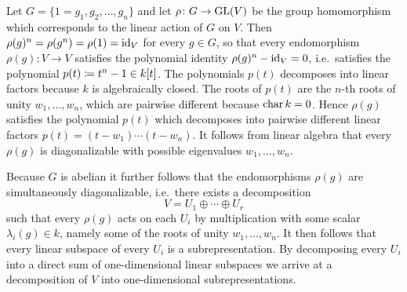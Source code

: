 \begin{example}
\begin{enumerate}
      Let $G = \{1 = g_1, g_2, \dotsc, g_n\}$ and let $\rho \colon G \to \operatorname{GL}(V)$ be the group homomorphism which corresponds to the linear action of $G$ on $V$.
      Then $\rho(g)^n = \rho(g^n) = \rho(1) = \operatorname{id}_V$ for every $g \in G$, so that every endomorphism $\rho(g) \colon V \to V$ satisfies the polynomial identity $\rho(g)^n - \operatorname{id}_V = 0$, i.e.\ satisfies the polynomial $p(t) \coloneqq t^n - 1 \in k[t]$.
      The polynomials $p(t)$ decomposes into linear factors because $k$ is algebraically closed.
      The roots of $p(t)$ are the $n$-th roots of unity $w_1, \dotsc, w_n$, which are pairwise different because $\operatorname{char} k = 0$.
      Hence $\rho(g)$ satisfies the polynomial $p(t)$ which decomposes into pairwise different linear factors $p(t) = (t - w_1) \dotsm (t - w_n)$.
      It follows from linear algebra that every $\rho(g)$ is diagonalizable with possible eigenvalues $w_1, \dotsc, w_n$.
      
      Because $G$ is abelian it further follows that the endomorphisms $\rho(g)$ are simultaneously diagonalizable, i.e.\ there exists a decomposition
      \[
          V
        = U_1 \oplus \dotsb \oplus U_r
      \]
      such that every $\rho(g)$ acts on each $U_i$ by multiplication with some scalar $\lambda_i(g) \in k$, namely some of the roots of unity $w_1, \dotsc, w_n$.
      It then follows that every linear subspace of every $U_i$ is a subrepresentation.
      By decomposing every $U_i$ into a direct sum of one-dimensional linear subspaces we arrive at a decomposition of $V$ into one-dimensional subrepresentations.
  \end{enumerate}
\end{example}



